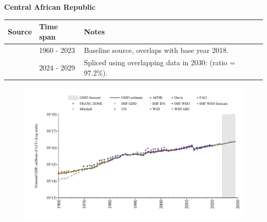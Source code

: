 \documentclass[12pt,a4paper,landscape]{article}
\begin{document}
\begin{adjustbox}{max totalsize={\paperwidth}{\paperheight},center}
\begin{minipage}[t][\textheight][t]{\textwidth}
\vspace*{0.5cm}
{}
\begin{center}
{\Large\bfseries Central African Republic}
\end{center}
\vspace{0.5cm}
\begin{table}[H]
\centering
\small
\begin{tabular}{|l|l|l|}
\hline
\textbf{Source} & \textbf{Time span} & \textbf{Notes} \\
\hline
\rowcolor{white}\cite{WDI}& 1960 - 2023 &Baseline source, overlaps with base year 2018.\\
\rowcolor{lightgray}\cite{IMF_WEO_forecast}& 2024 - 2029 &Spliced using overlapping data in 2030: (ratio = 97.2\%).\\
\hline
\end{tabular}
\end{table}
\begin{figure}[H]
\centering
\includegraphics[width=\textwidth,height=0.6\textheight,keepaspectratio]{graphs/CAF_nGDP.pdf}
\end{figure}
\end{minipage}
\end{adjustbox}
\end{document}
